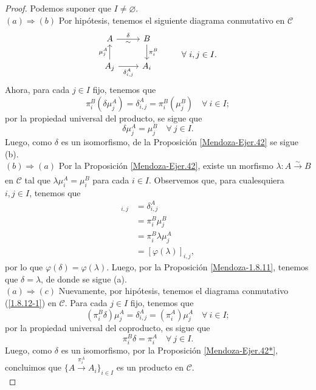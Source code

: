 \documentclass[tesis]{subfiles}
\begin{document}
\begin{proof}

    Podemos suponer que $I\neq\varnothing$. \\

    $(a)\Rightarrow(b)$ Por hipótesis, tenemos el siguiente diagrama conmutativo en $\mathscr{C}$
    \begin{equation}\label{1.8.12-1}
        \begin{tikzcd}
            A \arrow[]{r}{\delta}[swap]{\sim} &B \arrow[]{d}[]{\pi_i^B} &&\empty{} \\
            A_j \arrow[]{u}[]{\mu_j^A} \arrow[]{r}[swap]{\delta_{i,j}^A} &A_i &&\empty{} \arrow[phantom]{u}[]{\forall \ i,j\in I.}
        \end{tikzcd}
    \end{equation}
    Ahora, para cada $j\in I$ fijo, tenemos que
    \[
        \pi_i^B(\delta\mu_j^A) = \delta_{i,j}^A = \pi_i^B(\mu_j^B) \quad \forall \ i\in I;
    \] 
    por la propiedad universal del producto, se sigue que
    \[
        \delta\mu_j^A = \mu_j^B \quad \forall \ j\in I.
    \] 
    Luego, como $\delta$ es un isomorfismo, de la Proposición \ref{Mendoza-Ejer.42} se sigue (b). \\

    $(b)\Rightarrow(a)$ Por la Proposición \ref{Mendoza-Ejer.42}, existe un morfismo $\lambda:A\xrightarrow[]{\sim}B$ en $\mathscr{C}$ tal que $\lambda\mu_i^A=\mu_i^B$ para cada $i\in I$. Observemos que, para cualesquiera $i,j\in I$, tenemos que
    \begin{align*}
        [\varphi(\delta)]_{i,j} &= \delta_{i,j}^A \\
                                 &= \pi_i^B\mu_j^B \\
                                 &= \pi_i^B\lambda\mu_j^A \\
                                 &= [\varphi(\lambda)]_{i,j},
    \end{align*}
    por lo que $\varphi(\delta)=\varphi(\lambda)$. Luego, por la Proposición \ref{Mendoza-1.8.11}, tenemos que $\delta=\lambda$, de donde se sigue (a). \\

    $(a)\Rightarrow (c)$ Nuevamente, por hipótesis, tenemos el diagrama conmutativo (\ref{1.8.12-1}) en $\mathscr{C}$. Para cada $j\in I$ fijo, tenemos que
    \[
        (\pi_i^B\delta)\mu_j^A = \delta_{i,j}^A = (\pi_i^A)\mu_j^A \quad \forall \ i\in I;
    \] 
    por la propiedad universal del coproducto, es sigue que
    \[
    \pi_i^B\delta = \pi_i^A \quad \forall \ j\in I.
    \] 
    Luego, como $\delta$ es un isomorfismo, por la Proposición \ref{Mendoza-Ejer.42*}, concluimos que $\big\{A\xrightarrow[]{\pi_i^A} A_i\big\}_{i\in I}$ es un producto en $\mathscr{C}$. \\


\end{proof}
\end{document}
